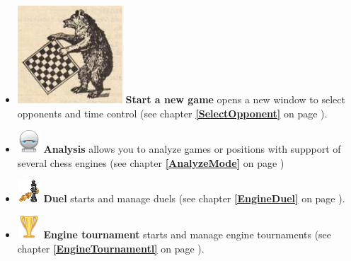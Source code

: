 \documentclass[11pt,a4paper]{article}
\begin{document}
\begin{itemize}
	\item \includegraphics[scale=0.2]{bearchess.png} \textbf{Start a new game} opens a new window to select opponents and time control (see chapter \textbf{\ref{SelectOpponent}  } on page \pageref{SelectOpponent}).
	
	\item \includegraphics[scale=0.5]{robot.png} \textbf{Analysis} allows you to analyze games or positions with suppport of several chess engines (see chapter \textbf{\ref{AnalyzeMode}  } on page \pageref{AnalyzeMode})
	
	\item \includegraphics[scale=0.5]{6-2-chess-png.png} \textbf{Duel} starts and manage duels (see chapter  \textbf{\ref{EngineDuel}  } on page \pageref{EngineDuel} ).
	
	\item \includegraphics[scale=0.5]{cup_gold.png} \textbf{Engine tournament} starts and manage engine tournaments (see chapter  \textbf{\ref{EngineTournamentl}  } on page \pageref{EngineTournamentl} ).
	

\end{itemize}
\end{document}
